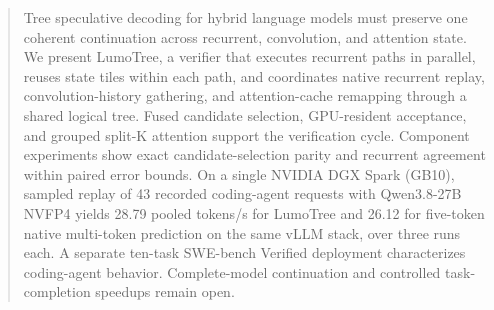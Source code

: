 \begin{abstract}
Tree speculative decoding for hybrid language models must preserve one coherent continuation across recurrent, convolution, and attention state. We present LumoTree, a verifier that executes recurrent paths in parallel, reuses state tiles within each path, and coordinates native recurrent replay, convolution-history gathering, and attention-cache remapping through a shared logical tree. Fused candidate selection, GPU-resident acceptance, and grouped split-K attention support the verification cycle. Component experiments show exact candidate-selection parity and recurrent agreement within paired error bounds. On a single NVIDIA DGX Spark (GB10), sampled replay of 43 recorded coding-agent requests with Qwen3.8-27B NVFP4 yields 28.79 pooled tokens/s for LumoTree and 26.12 for five-token native multi-token prediction on the same vLLM stack, over three runs each. A separate ten-task SWE-bench Verified deployment characterizes coding-agent behavior. Complete-model continuation and controlled task-completion speedups remain open.
\end{abstract}
